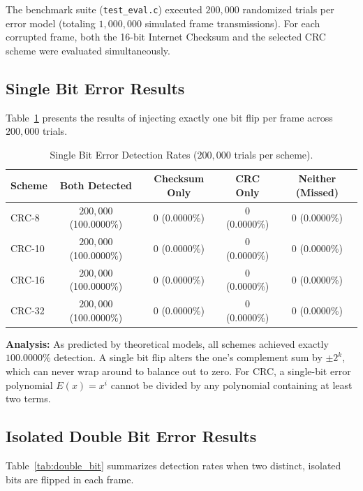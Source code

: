 \documentclass[11pt,a4paper]{article}
\begin{document}
The benchmark suite (\texttt{test\_eval.c}) executed $200{,}000$ randomized trials per error model (totaling $1{,}000{,}000$ simulated frame transmissions). For each corrupted frame, both the 16-bit Internet Checksum and the selected CRC scheme were evaluated simultaneously.

\subsection{Single Bit Error Results}

Table~\ref{tab:single_bit} presents the results of injecting exactly one bit flip per frame across $200{,}000$ trials.

\begin{table}[H]
    \centering
    \begin{tabular}{lcccc}
        \toprule
        \textbf{Scheme} & \textbf{Both Detected} & \textbf{Checksum Only} & \textbf{CRC Only} & \textbf{Neither (Missed)} \\
        \midrule
        CRC-8  & $200{,}000$ (100.0000\%) & 0 (0.0000\%) & 0 (0.0000\%) & 0 (0.0000\%) \\
        CRC-10 & $200{,}000$ (100.0000\%) & 0 (0.0000\%) & 0 (0.0000\%) & 0 (0.0000\%) \\
        CRC-16 & $200{,}000$ (100.0000\%) & 0 (0.0000\%) & 0 (0.0000\%) & 0 (0.0000\%) \\
        CRC-32 & $200{,}000$ (100.0000\%) & 0 (0.0000\%) & 0 (0.0000\%) & 0 (0.0000\%) \\
        \bottomrule
    \end{tabular}
    \caption{Single Bit Error Detection Rates ($200{,}000$ trials per scheme).}
    \label{tab:single_bit}
\end{table}

\textbf{Analysis:} As predicted by theoretical models, all schemes achieved exactly $100.0000\%$ detection. A single bit flip alters the one's complement sum by $\pm 2^k$, which can never wrap around to balance out to zero. For CRC, a single-bit error polynomial $E(x) = x^i$ cannot be divided by any polynomial containing at least two terms.

\subsection{Isolated Double Bit Error Results}

Table~\ref{tab:double_bit} summarizes detection rates when two distinct, isolated bits are flipped in each frame.
\end{document}
